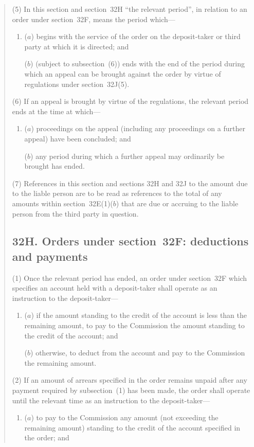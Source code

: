 \documentclass[12pt,a4paper]{article}
\begin{document}
\begin{quotation}
(5)
In this section and section~32H “the relevant period”, in relation to an order under section~32F, means the period which---
\begin{enumerate}\item[]
($a$) begins with the service of the order on the deposit-taker or third party at which it is directed; and

($b$) (subject to subsection~(6)) ends with the end of the period during which an appeal can be brought against the order by virtue of regulations under section~32J(5).
\end{enumerate}

(6) If an appeal is brought by virtue of the regulations, the relevant period ends at the time at which---
\begin{enumerate}\item[]
($a$) proceedings on the appeal (including any proceedings on a further appeal) have been concluded; and

($b$) any period during which a further appeal may ordinarily be brought has ended.
\end{enumerate}

(7) References in this section and sections 32H and 32J to the amount due to the liable person are to be read as references to the total of any amounts within section~32E(1)($b$) that are due or accruing to the liable person from the third party in question.

\subsection*{\sloppy 32H. Orders under section~32F: deductions and payments}

(1) Once the relevant period has ended, an order under section~32F which specifies an account held with a deposit-taker shall operate as an instruction to the deposit-taker---
\begin{enumerate}\item[]
($a$) if the amount standing to the credit of the account is less than the remaining amount, to pay to the Commission the amount standing to the credit of the account; and

($b$) otherwise, to deduct from the account and pay to the Commission the remaining amount.
\end{enumerate}

(2) If an amount of arrears specified in the order remains unpaid after any payment required by subsection~(1) has been made, the order shall operate until the relevant time as an instruction to the deposit-taker---
\begin{enumerate}\item[]
($a$) to pay to the Commission any amount (not exceeding the remaining
amount) standing to the credit of the account specified in the order; and


\end{enumerate}
\end{quotation}
\end{document}
